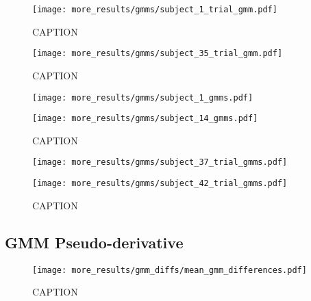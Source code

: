 \documentclass[../main.tex]{subfiles}
\begin{document}
\begin{figure}[tph]
  \centering
    \texttt{[image: more\_results/gmms/subject\_1\_trial\_gmm.pdf]}
    \caption[Subject 1 trial GMMs overlayed on trajectories]{CAPTION}\label{fig:example_1_trial_data_gmms}
\end{figure}

\begin{figure}[tph]
  \centering
    \texttt{[image: more\_results/gmms/subject\_35\_trial\_gmm.pdf]}
    \caption[Subject 35 trial GMMs overlayed on trajectories]{CAPTION}\label{fig:example_35_trial_data_gmms}
\end{figure}


\begin{figure}[tph]
  \centering
  \begin{minipage}{0.49\textwidth}
    \texttt{[image: more\_results/gmms/subject\_1\_gmms.pdf]}
    \subcaption{}
  \end{minipage}%
  \begin{minipage}{0.49\textwidth}
    \texttt{[image: more\_results/gmms/subject\_14\_gmms.pdf]}
    \subcaption{}
  \end{minipage}
  \caption[Example GMMs for subjects 1 and 14]{CAPTION}\label{fig:example_gmms}
\end{figure}

\begin{figure}[tph]
  \centering
  \begin{minipage}{0.49\textwidth}
    \texttt{[image: more\_results/gmms/subject\_37\_trial\_gmms.pdf]}
    \subcaption{}
  \end{minipage}%
  \begin{minipage}{0.49\textwidth}
    \texttt{[image: more\_results/gmms/subject\_42\_trial\_gmms.pdf]}
    \subcaption{}
  \end{minipage}
  \caption[Example trial GMMs for subjects 37 and 42]{CAPTION}\label{fig:example_trial_gmms}
\end{figure}


\subsection{GMM Pseudo-derivative}

\begin{figure}[tph]
  \centering
    \texttt{[image: more\_results/gmm\_diffs/mean\_gmm\_differences.pdf]}
    \caption[Mean GMM differences over subjects]{CAPTION}\label{fig:gmm_diffs}
\end{figure}
\end{document}
